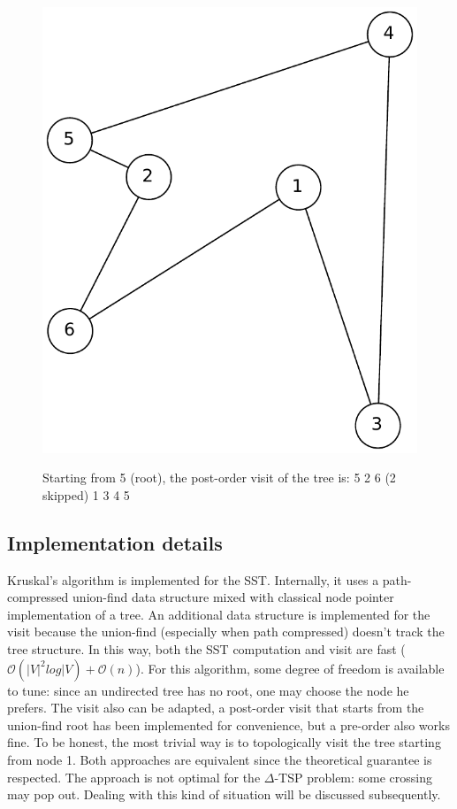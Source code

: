 \begin{figure}[h]
\begin{minipage}{.3\textwidth}
        \label{fig:sub2}
    \end{minipage}
    \begin{minipage}{.3\textwidth}
        \centering
        \includegraphics[width=0.8\linewidth]{figures/2approxc}
        \label{fig:sub2}
    \end{minipage}
    \caption[Shortcut example]{\centering Starting from 5 (root), the post-order visit of the tree
    is: 5 2 6 (2 skipped) 1 3 4 5}
\end{figure}

\subsection{Implementation details}
Kruskal's algorithm is implemented for the SST. Internally, it uses a
path-compressed union-find data structure mixed with classical node pointer
implementation of a tree. An additional data structure is implemented for the
visit because the union-find (especially when path compressed) doesn't track the
tree structure. In this way, both the SST computation and visit are fast
($\mathcal{O}(|V|^2log|V) + \mathcal{O}(n)$).
For this algorithm, some degree of freedom is available to tune: since an
undirected tree has no root, one may choose the node he prefers. The visit also
can be adapted, a post-order visit that starts from the union-find root has been
implemented for convenience, but a pre-order also works fine. To be honest, the
most trivial way is to topologically visit the tree starting from node 1. Both
approaches are equivalent since the theoretical guarantee is respected.
The approach is not optimal for the $\Delta$-TSP problem: some crossing may
pop out. Dealing with this kind of situation will be discussed subsequently.

